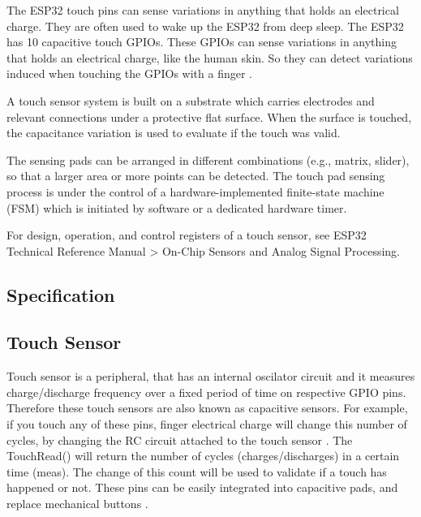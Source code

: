 The ESP32 touch pins can sense variations in anything that holds an electrical charge. They are often used to wake up the ESP32 from deep sleep. The ESP32 has 10 capacitive touch GPIOs. These GPIOs can sense variations in anything that holds an electrical charge, like the human skin. So they can detect variations induced when touching the GPIOs with a finger \cite{Azzam:2021}.

A touch sensor system is built on a substrate which carries electrodes and relevant connections under a protective flat surface. When the surface is touched, the capacitance variation is used to evaluate if the touch was valid.

The sensing pads can be arranged in different combinations (e.g., matrix, slider), so that a larger area or more points can be detected. The touch pad sensing process is under the control of a hardware-implemented finite-state machine (FSM) which is initiated by software \cite{Arif:202} or a dedicated hardware timer.

For design, operation, and control registers of a touch sensor, see ESP32 Technical Reference Manual > On-Chip Sensors and Analog Signal Processing.



\subsection{Specification}
\subsection{Touch Sensor }

Touch sensor is a peripheral, that has an internal oscilator circuit and it measures charge/discharge frequency over a fixed period of time on respective GPIO pins. Therefore these touch sensors are also known as capacitive sensors. For example, if you touch any of these pins, finger electrical charge will change this number of cycles, by changing the RC circuit attached to the touch sensor \cite{Arif:2023}. The TouchRead() will return the number of cycles (charges/discharges) in a certain time (meas). The change of this count will be used to validate if a touch has happened or not. These pins can be easily integrated into capacitive pads, and replace mechanical buttons \cite{Kumar:2024}.



